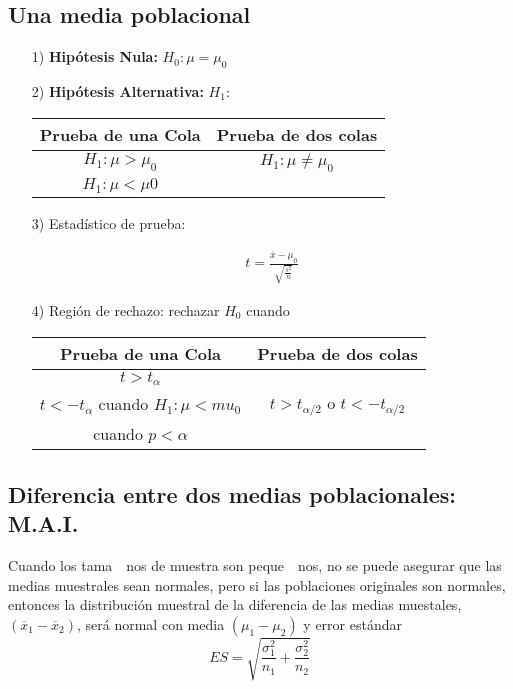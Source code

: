 \subsection*{Una media poblacional}

\begin{itemize}
\item[1) ] \textbf{Hip\'otesis Nula:} $H_{0}:\mu=\mu_{0}$
\item[2) ] \textbf{Hip\'otesis Alternativa: } $H_{1}:$

\begin{tabular}{cc}\hline
\textbf{Prueba de una Cola} & \textbf{Prueba de dos colas}\\\hline
$H_{1}:\mu>\mu_{0}$ & $H_{1}:\mu\neq \mu_{0}$\\ 
$H_{1}:\mu<\mu0$&\\
\end{tabular}

\item[3) ] Estad\'istico de prueba:

\begin{eqnarray*}
t=\frac{\overline{x}-\mu_{0}}{\sqrt{\frac{s^{2}}{n}}}
\end{eqnarray*}

\item[4) ] Regi\'on de rechazo: rechazar $H_{0}$ cuando

\begin{tabular}{cc}\hline
\textbf{Prueba de una Cola} & \textbf{Prueba de dos colas}\\\hline
$t>t_{\alpha}$ & \\
$t<-t_{\alpha}$ cuando $H_{1}:\mu<mu_{0}$&$t>t_{\alpha/2}$ o $t<-t_{\alpha/2}$\\
 cuando $p<\alpha$&\\
\end{tabular}
\end{itemize}


\subsection*{Diferencia entre dos medias poblacionales: M.A.I.}

Cuando los tama\ ~nos de muestra son peque\ ~nos, no se puede asegurar que las medias muestrales sean normales, pero si las poblaciones originales son normales, entonces la distribuci\'on muestral de la diferencia de las medias muestales, $\left(\overline{x}_{1}-\overline{x}_{2}\right)$, ser\'a normal con media $\left(\mu_{1}-\mu_{2}\right)$ y error est\'andar $$ES=\sqrt{\frac{\sigma_{1}^{2}}{n_{1}}+\frac{\sigma_{2}^{2}}{n_{2}}}$$


